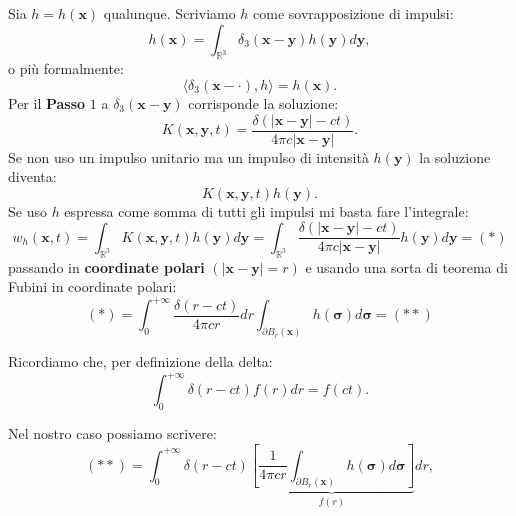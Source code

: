 \documentclass[10pt,a4paper,twoside,openright]{book}
\begin{document}
Sia $\displaystyle h=h(\mathbf{x})$ qualunque. Scriviamo $\displaystyle h$ come sovrapposizione di impulsi:
\begin{equation*}
	h(\mathbf{x}) =\int _{\mathbb{R}^{3}} \delta _{3}(\mathbf{x} -\mathbf{y}) h(\mathbf{y}) d\mathbf{y} ,
\end{equation*}
o più formalmente:
\begin{equation*}
	\langle \delta _{3}(\mathbf{x} -\mathbf{\cdotp }) ,h\rangle =h(\mathbf{x}) .
\end{equation*}
Per il \textbf{Passo }$\displaystyle 1$ a $\displaystyle \delta _{3}(\mathbf{x} -\mathbf{y})$ corrisponde la soluzione:
\begin{equation*}
	K(\mathbf{x} ,\mathbf{y} ,t) =\frac{\delta (| \mathbf{x} -\mathbf{y}| -ct)}{4\pi c| \mathbf{x} -\mathbf{y}| } .
\end{equation*}
Se non uso un impulso unitario ma un impulso di intensità $\displaystyle h(\mathbf{y})$ la soluzione diventa:
\begin{equation*}
	K(\mathbf{x} ,\mathbf{y} ,t) h(\mathbf{y}) .
\end{equation*}
Se uso $\displaystyle h$ espressa come somma di tutti gli impulsi mi basta fare l'integrale:
\begin{equation*}
	w_{h}(\mathbf{x} ,t) =\int _{\mathbb{R}^{3}} K(\mathbf{x} ,\mathbf{y} ,t) h(\mathbf{y}) d\mathbf{y} =\int _{\mathbb{R}^{3}}\frac{\delta (| \mathbf{x} -\mathbf{y}| -ct)}{4\pi c| \mathbf{x} -\mathbf{y}| } h(\mathbf{y}) d\mathbf{y} =( *)
\end{equation*}
passando in \textbf{coordinate polari} $\displaystyle (| \mathbf{x} -\mathbf{y}| =r)$ e usando una sorta di teorema di Fubini in coordinate polari:
\begin{equation*}
	( *) =\int _{0}^{+\infty }\frac{\delta ( r-ct)}{4\pi cr} dr\int _{\partial B_{r}(\mathbf{x})} h(\bm{\sigma }) d\bm{\sigma } =( **)
\end{equation*}
\begin{oss}
	Ricordiamo che, per definizione della delta:
	\begin{equation}
		\int _{0}^{+\infty } \delta ( r-ct) f( r) dr=f( ct) .
		\label{eq:onde-osservazione-delta}
	\end{equation}
\end{oss}
Nel nostro caso possiamo scrivere:
\begin{equation*}
	( **) =\int _{0}^{+\infty } \delta ( r-ct)\underbrace{\left[\frac{1}{4\pi cr}\int _{\partial B_{r}(\mathbf{x})} h(\bm{\sigma }) d\bm{\sigma }\right]}_{f( r)} dr,
\end{equation*}
\end{document}
